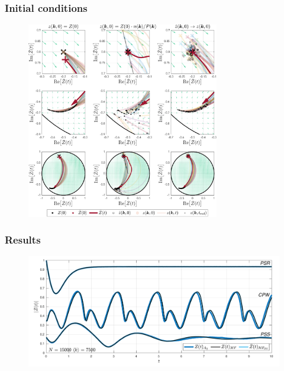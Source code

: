 \begin{frame}
\frametitle{Initial conditions} 
\begin{figure}[H]
\centering
\includegraphics[trim=0cm 8.5cm 0cm 0cm, clip=true, width = 0.75\textwidth]{../Figures/PhaseSpace/Mappings.pdf}
   \label{fig:mappings}
\end{figure}
\end{frame}


\begin{frame}
\frametitle{Results} 
\begin{figure}[H]
\centering
\includegraphics[width = \textwidth, trim={0 3mm 0 3mm},clip]{../Figures/InspectMeanFieldFixedDegree.pdf}
\label{fig:InspectMeanFieldFixedDegree}
\end{figure}
\end{frame}

